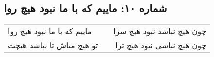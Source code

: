 \begin{center}
\section*{شماره ۱۰: ماییم که با ما نبود هیچ روا}
\label{sec:010}
\begin{longtable}{l p{0.5cm} r}
ماییم که با ما نبود هیچ روا
&&
چون هیچ نباشد نبود هیچ سزا
\\
تو هیچ مباش تا نباشد هیچت
&&
چون هیچ نباشی نبود هیچ ترا
\\
\end{longtable}
\end{center}

